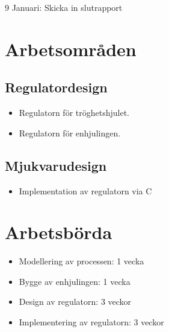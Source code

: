 \documentclass[a4paper]{article}
\begin{document}
9 Januari: Skicka in slutrapport

\section{Arbetsområden}
	
    \subsection*{Regulatordesign}

    \begin{itemize}
    \item [] Regulatorn för tröghetshjulet.
    \item [] Regulatorn för enhjulingen.
    \end{itemize}
    
    \subsection*{Mjukvarudesign}
    
    \begin{itemize}
    \item [] Implementation av regulatorn via C
    \end{itemize}
    
    
    
\section{Arbetsbörda}

\begin{itemize}
\item[] Modellering av processen: 1 vecka

\item[] Bygge av enhjulingen: 1 vecka

\item[] Design av regulatorn: 3 veckor

\item[] Implementering av regulatorn: 3 veckor
\end{itemize}
\end{document}
